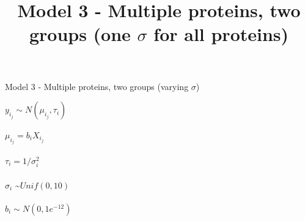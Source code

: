 \documentclass[12pt]{article}
\title{Model 3 - Multiple proteins, two groups (one $\sigma$ for all proteins)}
\begin{document}
\begin{center}{\LARGE Model 3 - Multiple proteins, two groups (varying $\sigma$)}\end{center} 

\hspace{0.2in}

$y_i_j \sim N(\mu_i_j, \tau_i)$ 
\\

\\
$\mu_i_j = b_iX_i_j$
\\

\\
$\tau_i= 1/\sigma_i^2$
\\

\\
$\sigma_i$ \sim $Unif(0, 10)$
\\

\\
$b_i \sim N(0, 1e^{-12})$
\\

\\

\\

\\
\\
\\
\\
\\

\\

\\
\end{document}
